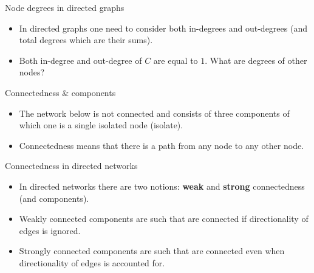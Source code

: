 \documentclass[
    hyperref={colorlinks,linkcolor=blue,urlcolor=blue,citecolor=blue}
]{beamer}
\begin{document}
\begin{frame}{Node degrees in directed graphs}
\begin{itemize}
    \item<2-> In directed graphs one need to consider both in-degrees
    and out-degrees (and total degrees which are their sums).
\end{itemize}
\pause
\begin{center}
\end{center}
\pause
\begin{itemize}
    \item Both in-degree and out-degree of $C$ are equal to $1$.
    What are degrees of other nodes?
\end{itemize}
\end{frame}

\begin{frame}{Connectedness \& components}
\begin{itemize}
    \item The network below is not connected and consists of three
    components of which one is a single isolated node (isolate).
\end{itemize}
\begin{center}
\end{center}
\pause
\begin{itemize}
    \item Connectedness means that there is a path from any node to
    any other node.
\end{itemize}
\end{frame}

\begin{frame}{Connectedness in directed networks}
\begin{itemize}
    \item<2-> In directed networks there are two notions: \textbf{weak} and
    \textbf{strong} connectedness (and components).
    \item<3-> Weakly connected components are such that are connected
    if directionality of edges is ignored.
    \item<4-> Strongly connected components are such that are connected
    even when directionality of edges is accounted for.
\end{itemize}
\end{frame}
\end{document}
